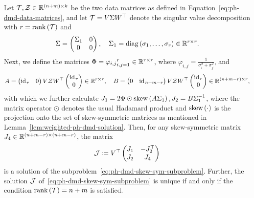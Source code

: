 \begin{theorem}
    Let $\mcl{T}, \mcl{Z} \in \bb{R}^{(n + m) \times k}$ be the two data matrices as defined in Equation~\eqref{eq:ph-dmd-data-matrices}, and let $\mcl{T} = V \Sigma W\trans$ denote the singular value decomposition with $r = \rank{\mcl{T}}$ and
    \begin{equation*}
        \Sigma = \begin{pmatrix}
            \Sigma_1 & 0 \\
            0 & 0
        \end{pmatrix},\quad \Sigma_1 = \diag{\sigma_1, \dots, \sigma_r} \in \bb{R}^{r \times r}.
    \end{equation*}
    Next, we define the matrices $\Phi = {\varphi_{i, j}}_{i, j = 1}^r \in \bb{R}^{r \times r}$, where $\varphi_{i, j} = \frac{1}{\sigma_i^2 + \sigma_j^2}$, and
    \begin{equation*}
        A = \begin{pmatrix}
            \id[r] & 0
        \end{pmatrix} V \mcl{Z} W\trans \begin{pmatrix}
            \id[r] \\
            0
        \end{pmatrix} \in \bb{R}^{r \times r},\quad B = \begin{pmatrix}
            0 & \id[n + m - r]
        \end{pmatrix} V \mcl{Z} W\trans \begin{pmatrix}
            \id[r] \\
            0
        \end{pmatrix} \in \bb{R}^{(n + m - r) \times r},
    \end{equation*}
    with which we further calculate $J_1 = 2 \Phi \odot \sksym{A \Sigma_1}, J_2 = B \Sigma_1\inv$, where the matrix operator $\odot$ denotes the usual Hadamard product and $\sksym{\cdot}$ is the projection onto the set of skew-symmetric matrices as mentioned in Lemma~\ref{lem:weighted-ph-dmd-solution}.
    Then, for any skew-symmetric matrix $J_4 \in \bb{R}^{(n + m - r) \times (n + m - r)}$, the matrix
    \begin{equation*}
        \mcl{J} \coloneqq V\trans \begin{pmatrix}
            J_1 & -J_2\trans \\
            J_2 & J_4
        \end{pmatrix}
    \end{equation*}
    is a solution of the subproblem~\eqref{eq:ph-dmd-skew-sym-subproblem}.
    Further, the solution $\mcl{J}$ of~\eqref{eq:ph-dmd-skew-sym-subproblem} is unique if and only if the condition $\rank{\mcl{T}} = n + m$ is satisfied.
\end{theorem}

